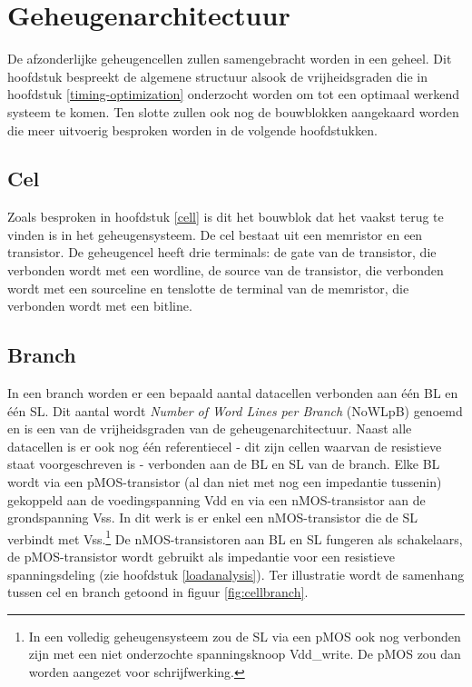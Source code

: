 \chapter{Geheugenarchitectuur}
\label{architecture}
De afzonderlijke geheugencellen zullen samengebracht worden in een geheel.
Dit hoofdstuk bespreekt de algemene structuur alsook de vrijheidsgraden die in hoofdstuk \ref{timing-optimization} onderzocht worden om tot een optimaal werkend systeem te komen. Ten slotte zullen ook nog de bouwblokken aangekaard worden die meer uitvoerig besproken worden in de volgende hoofdstukken. 


\section{Cel}
Zoals besproken in hoofdstuk \ref{cell} is dit het bouwblok dat het vaakst terug te vinden is in het geheugensysteem.
De cel bestaat uit een memristor en een transistor. De geheugencel heeft drie terminals: de gate van de transistor, die verbonden wordt met een wordline, de source van de transistor, die verbonden wordt met een sourceline en tenslotte de terminal van de memristor, die verbonden wordt met een bitline.

\section{Branch}
In een branch worden er een bepaald aantal datacellen verbonden aan één BL en één SL. Dit aantal wordt \emph{Number of Word Lines per Branch} (NoWLpB) genoemd en is een van de vrijheidsgraden van de geheugenarchitectuur. Naast alle datacellen is er ook nog één referentiecel - dit zijn cellen waarvan de resistieve staat voorgeschreven is - verbonden aan de BL en SL van de branch.
Elke BL wordt via een pMOS-transistor (al dan niet met nog een impedantie tussenin) gekoppeld aan de voedingspanning Vdd en via een nMOS-transistor aan de grondspanning Vss. In dit werk is er enkel een nMOS-transistor die de SL verbindt met Vss.\footnote{In een volledig geheugensysteem zou de SL via een pMOS ook nog verbonden zijn met een niet onderzochte spanningsknoop Vdd\_write. De pMOS zou dan worden aangezet voor schrijfwerking.} De nMOS-transistoren aan BL en SL fungeren als schakelaars, de pMOS-transistor wordt gebruikt als impedantie voor een resistieve spanningsdeling (zie hoofdstuk \ref{loadanalysis}).
Ter illustratie wordt de samenhang tussen cel en branch getoond in figuur \ref{fig:cellbranch}.

